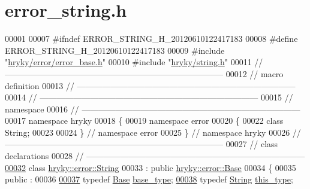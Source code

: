 \hypertarget{error__string_8h_source}{\section{error\-\_\-string.\-h}
}

\begin{DoxyCode}
00001 
00007 \textcolor{preprocessor}{#ifndef ERROR\_STRING\_H\_20120610122417183}
00008 \textcolor{preprocessor}{}\textcolor{preprocessor}{#define ERROR\_STRING\_H\_20120610122417183}
00009 \textcolor{preprocessor}{}\textcolor{preprocessor}{#include "\hyperlink{error__base_8h}{hryky/error/error_base.h}"}
00010 \textcolor{preprocessor}{#include "\hyperlink{string_8h}{hryky/string.h}"}
00011 \textcolor{comment}{//
      ------------------------------------------------------------------------------}
00012 \textcolor{comment}{// macro definition}
00013 \textcolor{comment}{//
      ------------------------------------------------------------------------------}
00014 \textcolor{comment}{//
      ------------------------------------------------------------------------------}
00015 \textcolor{comment}{// namespace}
00016 \textcolor{comment}{//
      ------------------------------------------------------------------------------}
00017 \textcolor{keyword}{namespace }hryky
00018 \{
00019 \textcolor{keyword}{namespace }error
00020 \{
00022     \textcolor{keyword}{class }String;
00023 
00024 \} \textcolor{comment}{// namespace error}
00025 \} \textcolor{comment}{// namespace hryky}
00026 \textcolor{comment}{//
      ------------------------------------------------------------------------------}
00027 \textcolor{comment}{// class declarations}
00028 \textcolor{comment}{//
      ------------------------------------------------------------------------------}
\hypertarget{error__string_8h_source_l00032}{}\hyperlink{classhryky_1_1error_1_1_string}{00032} \textcolor{comment}{}\textcolor{keyword}{class }\hyperlink{classhryky_1_1error_1_1_string}{hryky::error::String}
00033     : \textcolor{keyword}{public} \hyperlink{classhryky_1_1error_1_1_base}{hryky::error::Base}
00034 \{
00035 \textcolor{keyword}{public} :
00036 
\hypertarget{error__string_8h_source_l00037}{}\hyperlink{classhryky_1_1error_1_1_string_ab43687266760ba76199e5e67df0d9592}{00037}     \textcolor{keyword}{typedef} \hyperlink{classhryky_1_1error_1_1_base}{Base}                                \hyperlink{classhryky_1_1error_1_1_string_ab43687266760ba76199e5e67df0d9592}{base_type};
\hypertarget{error__string_8h_source_l00038}{}\hyperlink{classhryky_1_1error_1_1_string_a40dda5bd7d3b68cc8ec2577e4d67e8a9}{00038}     \textcolor{keyword}{typedef} \hyperlink{classhryky_1_1error_1_1_string}{String}                              \hyperlink{classhryky_1_1error_1_1_string_a40dda5bd7d3b68cc8ec2577e4d67e8a9}{this_type};

\end{DoxyCode}
